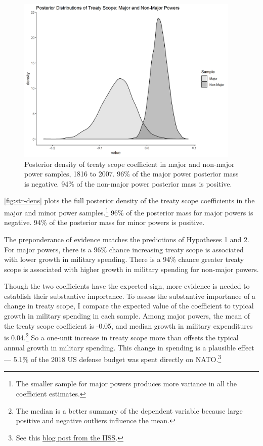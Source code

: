 \documentclass[12pt]{article}
\begin{document}
\begin{figure}[htbp]
	\centering
		\includegraphics[width=0.95\textwidth]{../figures/scope-dens.png}
	\caption{Posterior density of treaty scope coefficient in major and non-major power samples, 1816 to 2007. 96\% of the major power posterior mass is negative. 94\% of the non-major power posterior mass is positive.}
	\label{fig:str-dens}
\end{figure}


\autoref{fig:str-dens} plots the full posterior density of the treaty scope coefficients in the major and minor power samples.\footnote{The smaller sample for major powers produces more variance in all the coefficient estimates.} 
96\% of the posterior mass for major powers is negative. 
94\% of the posterior mass for minor powers is positive. 


The preponderance of evidence matches the predictions of Hypotheses 1 and 2. 
For major powers, there is a 96\% chance increasing treaty scope is associated with lower growth in military spending. 
There is a 94\% chance greater treaty scope is associated with higher growth in military spending for non-major powers.


Though the two coefficients have the expected sign, more evidence is needed to establish their substantive importance. 
To assess the substantive importance of a change in treaty scope, I compare the expected value of the coefficient to typical growth in military spending in each sample. 
Among major powers, the mean of the treaty scope coefficient is -0.05, and median growth in military expenditures is 0.04.\footnote{The median is a better summary of the dependent variable because large positive and negative outliers influence the mean.} 
So a one-unit increase in treaty scope more than offsets the typical annual growth in military spending. 
This change in spending is a plausible effect--- 5.1\% of the 2018 US defense budget was spent directly on NATO.\footnote{See this \href{https://www.iiss.org/blogs/military-balance/2018/07/us-and-nato-allies-costs-and-value}{blog post from the IISS}.} 
\end{document}
